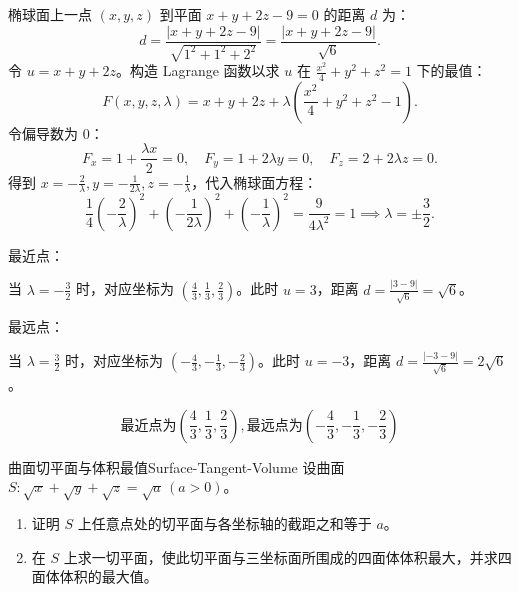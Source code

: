\begin{solution}
    椭球面上一点 $(x, y, z)$ 到平面 $x + y + 2z - 9 = 0$ 的距离 $d$ 为：
    \begin{equation}
        d = \frac{|x + y + 2z - 9|}{\sqrt{1^2 + 1^2 + 2^2}} = \frac{|x + y + 2z - 9|}{\sqrt{6}}.
    \end{equation}
    令 $u = x + y + 2z$。构造 Lagrange 函数以求 $u$ 在 $\frac{x^2}{4} + y^2 + z^2 = 1$ 下的最值：
    \begin{equation}
        F(x, y, z, \lambda) = x + y + 2z + \lambda \left( \frac{x^2}{4} + y^2 + z^2 - 1 \right).
    \end{equation}
    令偏导数为 $0$：
    \begin{equation}
        F_x = 1 + \frac{\lambda x}{2} = 0, \quad F_y = 1 + 2\lambda y = 0, \quad F_z = 2 + 2\lambda z = 0.
    \end{equation}
    得到 $x = -\frac{2}{\lambda}, y = -\frac{1}{2\lambda}, z = -\frac{1}{\lambda}$，代入椭球面方程：
    \begin{equation}
        \frac{1}{4} \left( -\frac{2}{\lambda} \right)^2 + \left( -\frac{1}{2\lambda} \right)^2 + \left( -\frac{1}{\lambda} \right)^2 = \frac{9}{4\lambda^2} = 1 \implies \lambda = \pm \frac{3}{2}.
    \end{equation}

     最近点：

    当 $\lambda = -\frac{3}{2}$ 时，对应坐标为 $\left( \frac{4}{3}, \frac{1}{3}, \frac{2}{3} \right)$。此时 $u = 3$，距离 $d = \frac{|3-9|}{\sqrt{6}} = \sqrt{6}$。

     最远点：

    当 $\lambda = \frac{3}{2}$ 时，对应坐标为 $\left( -\frac{4}{3}, -\frac{1}{3}, -\frac{2}{3} \right)$。此时 $u = -3$，距离 $d = \frac{|-3-9|}{\sqrt{6}} = 2\sqrt{6}$。

    \begin{equation}
        \boxed{\text{最近点为} \left( \frac{4}{3}, \frac{1}{3}, \frac{2}{3} \right), \text{最远点为} \left( -\frac{4}{3}, -\frac{1}{3}, -\frac{2}{3} \right)}
    \end{equation}
\end{solution}


\begin{problem}{曲面切平面与体积最值}{Surface-Tangent-Volume}
    设曲面 $S: \sqrt{x} + \sqrt{y} + \sqrt{z} = \sqrt{a} \, (a > 0)$。
    \begin{enumerate}
        \item 证明 $S$ 上任意点处的切平面与各坐标轴的截距之和等于 $a$。
        \item 在 $S$ 上求一切平面，使此切平面与三坐标面所围成的四面体体积最大，并求四面体体积的最大值。
    \end{enumerate}
\end{problem}

